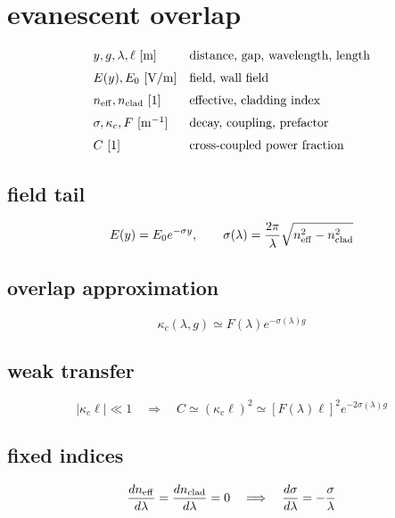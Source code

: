 \section*{evanescent overlap}
\[
\begin{array}{ll}y,g,\lambda,\ell\ [\mathrm m]&\text{distance, gap, wavelength, length}\\[0.6em]E(y),E_0\ [\mathrm{V/m}]&\text{field, wall field}\\[0.6em]n_{\rm eff},n_{\rm clad}\ [1]&\text{effective, cladding index}\\[0.6em]\sigma,\kappa_c,F\ [\mathrm{m^{-1}}]&\text{decay, coupling, prefactor}\\[0.6em]C\ [1]&\text{cross-coupled power fraction}\end{array}
\]
\subsection*{field tail}
\[
\displaystyle E(y)=E_0e^{-\sigma y},\qquad\sigma(\lambda)=\frac{2\pi}{\lambda}\sqrt{n_{\rm eff}^2-n_{\rm clad}^2}
\]
\subsection*{overlap approximation}
\[
\displaystyle \kappa_c(\lambda,g)\simeq F(\lambda)e^{-\sigma(\lambda)g}
\]
\subsection*{weak transfer}
\[
\displaystyle |\kappa_c\ell|\ll1\quad\Longrightarrow\quad C\simeq(\kappa_c\ell)^2\simeq[F(\lambda)\ell]^2e^{-2\sigma(\lambda)g}
\]
\subsection*{fixed indices}
\[
\displaystyle \frac{dn_{\rm eff}}{d\lambda}=\frac{dn_{\rm clad}}{d\lambda}=0\quad\Longrightarrow\quad\frac{d\sigma}{d\lambda}=-\frac{\sigma}{\lambda}
\]

